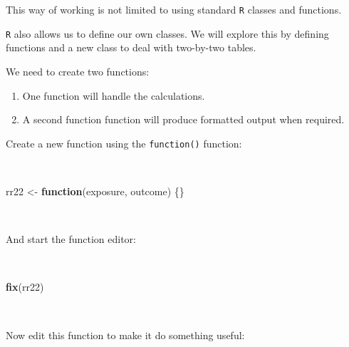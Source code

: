 \documentclass[12pt,a4paper]{book}
\newenvironment{Shaded}{\begin{snugshade}}{\end{snugshade}}
\newcommand{\KeywordTok}[1]{\textcolor[rgb]{0.13,0.29,0.53}{\textbf{#1}}}
\newcommand{\StringTok}[1]{\textcolor[rgb]{0.31,0.60,0.02}{#1}}
\newcommand{\ControlFlowTok}[1]{\textcolor[rgb]{0.13,0.29,0.53}{\textbf{#1}}}
\newcommand{\NormalTok}[1]{#1}
\theoremstyle{definition}
\theoremstyle{definition}
\theoremstyle{definition}
\theoremstyle{remark}
\begin{document}
This way of working is not limited to using standard \texttt{R} classes
and functions.

\texttt{R} also allows us to define our own classes. We will explore
this by defining functions and a new class to deal with two-by-two
tables.

We need to create two functions:

\begin{enumerate}
\def\labelenumi{\arabic{enumi}.}
\item
  One function will handle the calculations.
\item
  A second function function will produce formatted output when
  required.
\end{enumerate}

Create a new function using the \texttt{function()} function:

~

\begin{Shaded}
\begin{Highlighting}[]
\NormalTok{rr22 <-}\StringTok{ }\ControlFlowTok{function}\NormalTok{(exposure, outcome) \{\}}
\end{Highlighting}
\end{Shaded}

~

And start the function editor:

~

\begin{Shaded}
\begin{Highlighting}[]
\KeywordTok{fix}\NormalTok{(rr22)}
\end{Highlighting}
\end{Shaded}

~

Now edit this function to make it do something useful:

~
\end{document}
